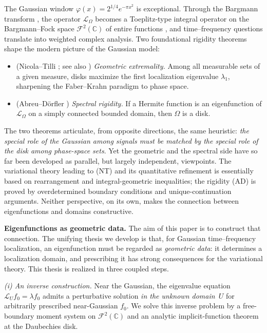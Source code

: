 \documentclass[a4paper,11pt,reqno]{amsart}
\numberwithin{equation}{section}
\theoremstyle{plain} %
\theoremstyle{definition} %
\theoremstyle{remark}
\newcommand{\C}{\mathbb{C}}
\begin{document}
The Gaussian window $\varphi(x)=2^{1/4}e^{-\pi x^2}$ is exceptional. Through the Bargmann transform \cite{Bargmann}, the operator $\mathcal L_\Omega$ becomes a Toeplitz-type integral operator on the Bargmann--Fock space $\mathcal F^2(\C)$ of entire functions \cite{Berezin,Berger-Coburn-Symbol,Berger-Coburn,Berger-Coburn-Heat,Zhu,Grochenig,Folland}, and time--frequency questions translate into weighted complex analysis. Two foundational rigidity theorems shape the modern picture of the Gaussian model:
\begin{itemize}
\item[\textbf{(NT)}] (Nicola--Tilli \cite{Nicola-Tilli}; see also \cite{Nicola-Tilli-2,Bastianoni-Cordero-Nicola,Bastianoni-Teofanov,Ramos-Tilli}) \emph{Geometric extremality.} Among all measurable sets of a given measure, disks maximize the first localization eigenvalue $\lambda_1$, sharpening the Faber--Krahn paradigm to phase space.
\item[\textbf{(AD)}] (Abreu--D\"orfler \cite{Abreu-Doerfler}) \emph{Spectral rigidity.} If a Hermite function is an eigenfunction of $\mathcal L_\Omega$ on a simply connected bounded domain, then $\Omega$ is a disk.
\end{itemize}
The two theorems articulate, from opposite directions, the same heuristic: \emph{the special role of the Gaussian among signals must be matched by the special role of the disk among phase-space sets}. Yet the geometric and the spectral side have so far been developed as parallel, but largely independent, viewpoints. The variational theory leading to (NT) and its quantitative refinement \cite{Gomez-Guerra-Ramos-Tilli} is essentially based on rearrangement and integral-geometric inequalities; the rigidity (AD) is proved by overdetermined boundary conditions and unique-continuation arguments. Neither perspective, on its own, makes the connection between eigenfunctions and domains constructive.

\medskip

\noindent\textbf{Eigenfunctions as geometric data.} The aim of this paper is to construct that connection. The unifying thesis we develop is that, for Gaussian time--frequency localization, an eigenfunction must be regarded as \emph{geometric data}: it determines a localization domain, and prescribing it has strong consequences for the variational theory. This thesis is realized in three coupled steps.

\smallskip
\noindent\emph{(i) An inverse construction.} Near the Gaussian, the eigenvalue equation $\mathcal L_U f_0=\lambda f_0$ admits a perturbative solution \emph{in the unknown domain~$U$} for arbitrarily prescribed near-Gaussian $f_0$. We solve this inverse problem by a free-boundary moment system on $\mathcal F^2(\C)$ and an analytic implicit-function theorem at the Daubechies disk.
\end{document}
